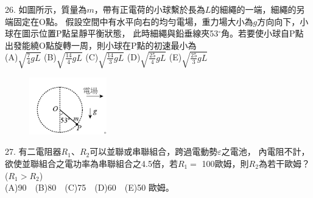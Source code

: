 \documentclass[cn,10pt,math=newtx,chinesefont=founder,device=ig]{elegantbook}
\begin{document}
\newpage


\begin{example}
   26. 如圖所示，質量為$m$，帶有正電荷的小球繫於長為$L$的細繩的一端，細繩的另端固定在O點。
   假設空間中有水平向右的均勻電場，重力場大小為$g$方向向下，小球在圖示位置P點呈靜平衡狀態，
   此時細繩與鉛垂線夾53$^\circ$角。若要使小球自P點出發能繞O點旋轉一周，則小球在P點的初速最小為\\
(A)$\sqrt{\frac{7}{4}gL}$ (B)$\sqrt{\frac{14}{4}gL}$ (C)$\sqrt{\frac{14}{3}gL}$ 
(D)$\sqrt{\frac{25}{4}gL}$ (E)$\sqrt{\frac{25}{3}gL}$
\\
    \rightline{[成德高中教甄109]}
\end{example}
\begin{solution}
    
\end{solution}
\begin{figure}[htbp]
    \flushright
    \includegraphics[width=0.3\textwidth]{image/109成德26.png}
  \end{figure}
\newpage


\begin{example}
   27. 有二電阻器$R_1$、$R_2$可以並聯或串聯組合，跨過電動勢$\varepsilon$之電池，
   內電阻不計，欲使並聯組合之電功率為串聯組合之4.5倍，若$R_1 =$ 100歐姆，則$R_2$為若干歐姆？($R_1 > R_2$)  \\
   (A)90　(B)80　(C)75　(D)60　(E)50  歐姆。\\
    \rightline{[成德高中教甄109]}
\end{example}
\begin{solution}
    
\end{solution}

\newpage
\end{document}
